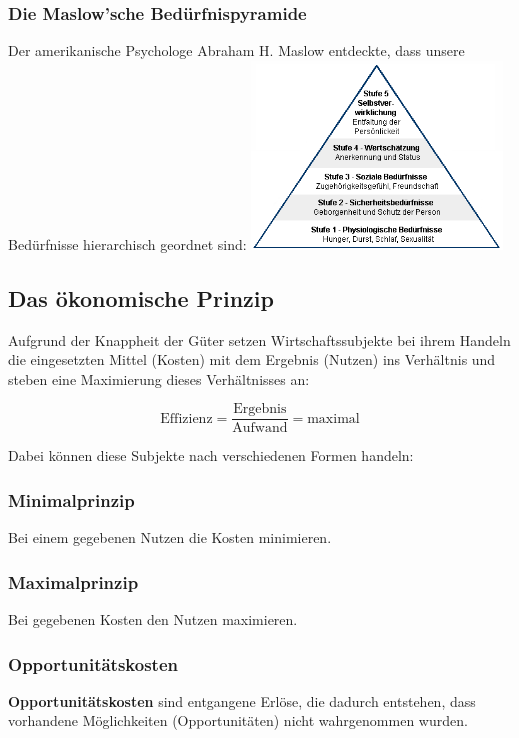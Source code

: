 \documentclass[titlepage,parskip=half]{scrartcl}
\begin{document}
\subsubsection{Die Maslow'sche Bedürfnispyramide}
Der amerikanische Psychologe Abraham H. Maslow entdeckte, dass unsere Bedürfnisse hierarchisch geordnet sind:\newline
\includegraphics[width=0.5\textwidth]{bilder/maslow.png}


\subsection{Das ökonomische Prinzip}
Aufgrund der Knappheit der Güter setzen Wirtschaftssubjekte bei ihrem Handeln die eingesetzten Mittel (Kosten) mit dem Ergebnis (Nutzen) ins Verhältnis und steben eine Maximierung dieses Verhältnisses an:

$$
\textrm{Effizienz} = \frac{\textrm{Ergebnis}}{\textrm{Aufwand}} = \textrm{maximal}
$$

Dabei können diese Subjekte nach verschiedenen Formen handeln:

\subsubsection{Minimalprinzip}
Bei einem gegebenen Nutzen die Kosten minimieren.

\subsubsection{Maximalprinzip}
Bei gegebenen Kosten den Nutzen maximieren.

\subsubsection{Opportunitätskosten} 
\textbf{Opportunitätskosten} sind entgangene Erlöse, die dadurch entstehen, dass vorhandene Mög\-lich\-kei\-ten (Opportunitäten) nicht wahrgenommen wurden.
\end{document}
